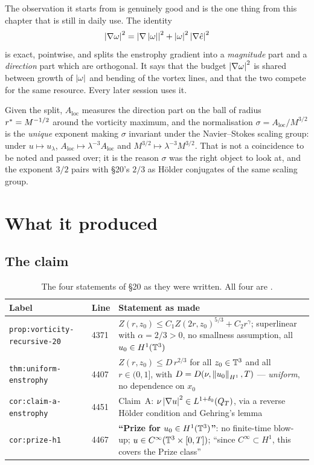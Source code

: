 The observation it starts from is genuinely good and is the one thing from
this chapter that is still in daily use. The identity
\[
  \left|\nabla\omega\right|^2 = \left|\nabla\left|\omega\right|\right|^2
    + \left|\omega\right|^2\left|\nabla\hat{e}\right|^2
\]
is exact, pointwise, and splits the enstrophy gradient into a
\emph{magnitude} part and a \emph{direction} part which are orthogonal. It
says that the budget \(\left|\nabla\omega\right|^2\) is shared between growth of
\(\left|\omega\right|\) and bending of the vortex lines, and that the two compete for
the same resource. Every later session uses it.

Given the split, \(A_{\mathrm{loc}}\) measures the direction part on the ball
of radius \(r^{*}=M^{-1/2}\) around the vorticity maximum, and the
normalisation \(\sigma=A_{\mathrm{loc}}/M^{3/2}\) is the \emph{unique} exponent
making \(\sigma\) invariant under the Navier--Stokes scaling group: under
\(u\mapsto u_\lambda\), \(A_{\mathrm{loc}}\mapsto\lambda^{-3}A_{\mathrm{loc}}\)
and \(M^{3/2}\mapsto\lambda^{-3}M^{3/2}\). That is not a coincidence to be
noted and passed over; it is the reason \(\sigma\) was the right object to
look at, and the exponent \(3/2\) pairs with \S20's \(2/3\) as H\"older
conjugates of the same scaling group.

\section{What it produced}
\label{sec:prize-produced}

\subsection{The claim}

\begin{table}[ht]
\centering
\small
\begin{tabular}{@{}l l p{}@{}}
\toprule
Label & Line & Statement as made \\
\midrule
\texttt{prop:vorticity-recursive-20} & 4371
  & \(Z(r,z_0)\le C_1Z(2r,z_0)^{5/3}+C_2r^\gamma\); superlinear with
    \(\alpha=2/3>0\), no smallness assumption, all \(u_0\in H^1(\mathbb{T}^3)\) \\[3pt]
\texttt{thm:uniform-enstrophy} & 4407
  & \(Z(r,z_0)\le D\,r^{2/3}\) for all \(z_0\in\mathbb{T}^3\) and all \(r\in(0,1]\),
    with \(D=D(\nu,\left\|u_0\right\|_{H^1},T)\) --- \emph{uniform}, no dependence on
    \(x_0\) \\[3pt]
\texttt{cor:claim-a-enstrophy} & 4451
  & Claim~A: \(\nu\left|\nabla u\right|^2\in L^{1+\delta_0}(Q_T)\), via a reverse
    H\"older condition and Gehring's lemma \\[3pt]
\texttt{cor:prize-h1} & 4467
  & \textbf{``Prize for \(u_0\in H^1(\mathbb{T}^3)\)''}: no finite-time blow-up;
    \(u\in C^\infty(\mathbb{T}^3\times[0,T])\); ``since \(C^\infty\subset H^1\), this
    covers the Prize class'' \\
\bottomrule
\end{tabular}
\caption[The  Prize claim]{The four statements of \S20 as they were
written. All four are \WITHDRAWN.}
\label{tab:prize-claim}
\end{table}

